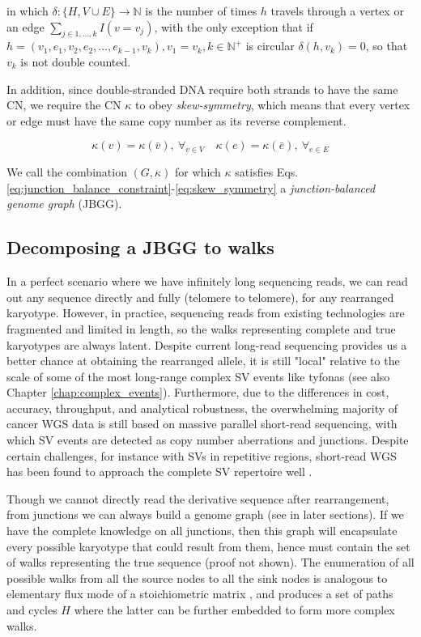 \documentclass[phd,tocprelim]{cornell}
\begin{document}
in which $\delta: \{H, V \cup E\} \rightarrow \mathbb{N}$ is the number of times $h$ travels through a vertex or an edge $\sum_{j \in 1,\dots,k}I(v = v_j)$, with the only exception that if $h = (v_1, e_1, v_2, e_2, \dots, e_{k-1}, v_k), v_1=v_k, k \in \mathbb{N^+}$ is circular $\delta(h,v_k) = 0$, so that $v_k$ is not double counted.

In addition, since double-stranded DNA require both strands to have the same CN, we require the CN $\kappa$ to obey \textit{skew-symmetry}, which means that every vertex or edge must have the same copy number as its reverse complement.

\begin{equation} \label{eq:skew_symmetry}
    \kappa(v) = \kappa(\bar{v}),\ \forall_{v \in V} \quad \kappa(e) = \kappa(\bar{e}),\ \forall_{e \in E}
\end{equation}

We call the combination $(G,\kappa)$ for which $\kappa$ satisfies Eqs. \ref{eq:junction_balance_constraint}-\ref{eq:skew_symmetry} a \textit{junction-balanced genome graph} (JBGG).

\subsection{Decomposing a JBGG to walks}
In a perfect scenario where we have infinitely long sequencing reads, we can read out any sequence directly and fully (telomere to telomere), for any rearranged karyotype. However, in practice, sequencing reads from existing technologies are fragmented and limited in length, so the walks representing complete and true karyotypes are always latent. Despite current long-read sequencing provides us a better chance at obtaining the rearranged allele, it is still "local" relative to the scale of some of the most long-range complex SV events like tyfonas \cite{Hadi2020-um} (see also Chapter \ref{chap:complex_events}). Furthermore, due to the differences in cost, accuracy, throughput, and analytical robustness, the overwhelming majority of cancer WGS data is still based on massive parallel short-read sequencing, with which SV events are detected as copy number aberrations and junctions. Despite certain challenges, for instance with SVs in repetitive regions, short-read WGS has been found to approach the complete SV repertoire well \cite{Behr2021-gf}.

Though we cannot directly read the derivative sequence after rearrangement, from junctions we can always build a genome graph (see  in later sections). If we have the complete knowledge on all junctions, then this graph will encapsulate every possible karyotype that could result from them, hence must contain the set of walks representing the true sequence (proof not shown). The enumeration of all possible walks from all the source nodes to all the sink nodes is analogous to elementary flux mode of a stoichiometric matrix \cite{Maarleveld2013}, and produces a set of paths and cycles $H$ where the latter can be further embedded to form more complex walks.
\end{document}
